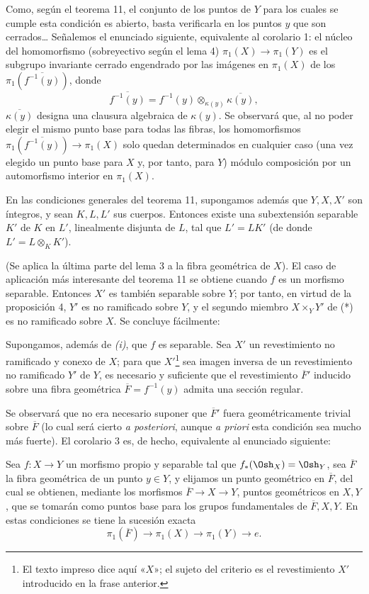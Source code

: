 Como, según el teorema 11, el conjunto de los puntos de $Y$ para los cuales se
cumple esta condición es abierto, basta verificarla en los puntos $y$ que son
cerrados\ldots{} Señalemos el enunciado siguiente, equivalente al corolario 1:
el núcleo del homomorfismo (sobreyectivo según el lema 4)
$\pi_1(X)\longrightarrow\pi_1(Y)$ es el subgrupo invariante cerrado engendrado
por las imágenes en $\pi_1(X)$ de los $\pi_1(\overline{f^{-1}(y)})$, donde
\[
  \overline{f^{-1}(y)}
  =f^{-1}(y)\otimes_{\kappa(y)}\overline{\kappa(y)},
\]
$\overline{\kappa(y)}$ designa una clausura algebraica de $\kappa(y)$. Se
observará que, al no poder elegir el mismo punto base para todas las fibras,
los homomorfismos $\pi_1(\overline{f^{-1}(y)})\longrightarrow\pi_1(X)$ solo
quedan determinados en cualquier caso (una vez elegido un punto base para $X$
y, por tanto, para $Y$) módulo composición por un automorfismo interior en
$\pi_1(X)$.

 En las condiciones generales del teorema 11, supongamos
además que $Y,X,X'$ son íntegros, y sean $K,L,L'$ sus cuerpos. Entonces existe
una subextensión separable $K'$ de $K$ en $L'$, linealmente disjunta de $L$, tal
que $L'=LK'$ (de donde $L'=L\otimes_K K'$).

(Se aplica la última parte del lema 3 a la fibra geométrica de $X$). El caso de
aplicación más interesante del teorema 11 se obtiene cuando $f$ es un morfismo
separable. Entonces $X'$ es también separable sobre $Y$; por tanto, en virtud
de la proposición 4, $Y'$ es no ramificado sobre $Y$, y el segundo miembro
$X\times_Y Y'$ de (*) es no ramificado sobre $X$. Se concluye fácilmente:

 Supongamos, además de \textit{(i)}, que $f$ es separable.
Sea $X'$ un revestimiento no ramificado y conexo de $X$; para que
$X'$\footnote{El texto impreso dice aquí «$X$»; el sujeto del criterio es el
revestimiento $X'$ introducido en la frase anterior.} sea imagen inversa de un
revestimiento no ramificado $Y'$ de $Y$, es necesario y suficiente que el
revestimiento $\overline F'$ inducido sobre una fibra geométrica
$\overline F=f^{-1}(y)$ admita una sección regular.

Se observará que no era necesario suponer que $\overline F'$ fuera
geométricamente trivial sobre $\overline F$ (lo cual será cierto \textit{a
posteriori}, aunque \textit{a priori} esta condición sea mucho más fuerte). El
corolario 3 es, de hecho, equivalente al enunciado siguiente:

 Sea $f:X\longrightarrow Y$ un morfismo propio y separable
tal que $f_*(\Osh_X)=\Osh_Y$, sea $\overline F$ la fibra geométrica de un punto
$y\in Y$, y elijamos un punto geométrico en $\overline F$, del cual se obtienen,
mediante los morfismos $\overline F\longrightarrow X\longrightarrow Y$, puntos
geométricos en $X,Y$, que se tomarán como puntos base para los grupos
fundamentales de $\overline F,X,Y$. En estas condiciones se tiene la sucesión
exacta
\[
  \boxed{
    \pi_1(\overline F)\longrightarrow\pi_1(X)
    \longrightarrow\pi_1(Y)\longrightarrow e
  }.
\]


